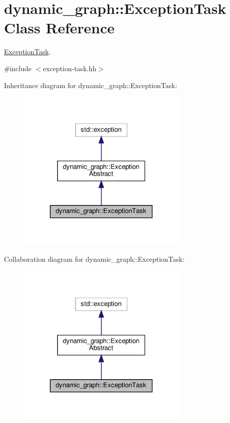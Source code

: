 \hypertarget{classdynamic__graph_1_1ExceptionTask}{}\section{dynamic\+\_\+graph\+:\+:Exception\+Task Class Reference}
\label{classdynamic__graph_1_1ExceptionTask}


\hyperlink{classdynamic__graph_1_1ExceptionTask}{Exception\+Task}.  




{\ttfamily \#include $<$exception-\/task.\+hh$>$}



Inheritance diagram for dynamic\+\_\+graph\+:\+:Exception\+Task\+:
\nopagebreak
\begin{figure}[H]
\begin{center}
\leavevmode
\includegraphics[width=234pt]{classdynamic__graph_1_1ExceptionTask__inherit__graph}
\end{center}
\end{figure}


Collaboration diagram for dynamic\+\_\+graph\+:\+:Exception\+Task\+:
\nopagebreak
\begin{figure}[H]
\begin{center}
\leavevmode
\includegraphics[width=234pt]{classdynamic__graph_1_1ExceptionTask__coll__graph}
\end{center}
\end{figure}
